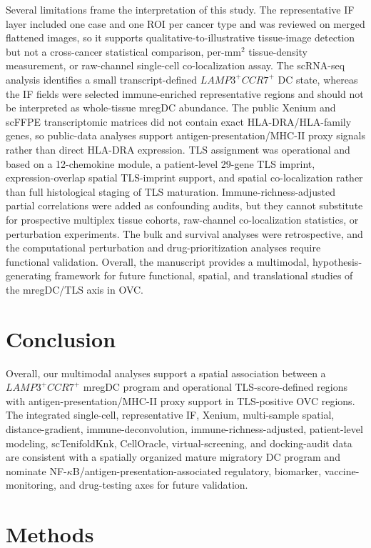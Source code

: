 \documentclass[pdflatex,sn-vancouver-num]{sn-jnl}
\begin{document}
Several limitations frame the interpretation of this study. The representative IF layer included one case and one ROI per cancer type and was reviewed on merged flattened images, so it supports qualitative-to-illustrative tissue-image detection but not a cross-cancer statistical comparison, per-mm$^{2}$ tissue-density measurement, or raw-channel single-cell co-localization assay. The scRNA-seq analysis identifies a small transcript-defined $LAMP3^{+}CCR7^{+}$ DC state, whereas the IF fields were selected immune-enriched representative regions and should not be interpreted as whole-tissue mregDC abundance. The public Xenium and scFFPE transcriptomic matrices did not contain exact HLA-DRA/HLA-family genes, so public-data analyses support antigen-presentation/MHC-II proxy signals rather than direct HLA-DRA expression. TLS assignment was operational and based on a 12-chemokine module, a patient-level 29-gene TLS imprint, expression-overlap spatial TLS-imprint support, and spatial co-localization rather than full histological staging of TLS maturation. Immune-richness-adjusted partial correlations were added as confounding audits, but they cannot substitute for prospective multiplex tissue cohorts, raw-channel co-localization statistics, or perturbation experiments. The bulk and survival analyses were retrospective, and the computational perturbation and drug-prioritization analyses require functional validation. Overall, the manuscript provides a multimodal, hypothesis-generating framework for future functional, spatial, and translational studies of the mregDC/TLS axis in OVC.

\section{Conclusion}
Overall, our multimodal analyses support a spatial association between a $LAMP3^{+}CCR7^{+}$ mregDC program and operational TLS-score-defined regions with antigen-presentation/MHC-II proxy support in TLS-positive OVC regions. The integrated single-cell, representative IF, Xenium, multi-sample spatial, distance-gradient, immune-deconvolution, immune-richness-adjusted, patient-level modeling, scTenifoldKnk, CellOracle, virtual-screening, and docking-audit data are consistent with a spatially organized mature migratory DC program and nominate NF-$\kappa$B/antigen-presentation-associated regulatory, biomarker, vaccine-monitoring, and drug-testing axes for future validation.



\section{Methods}
\end{document}
